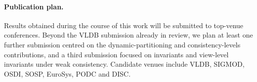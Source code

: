 
\paragraph{Publication plan.}
Results obtained during the course of this work will be submitted to top-venue conferences.
Beyond the VLDB submission already in review, we plan at least one further submission centred on the dynamic-partitioning and consistency-levels contributions, and a third submission focused on invariants and view-level invariants under weak consistency.
Candidate venues include VLDB, SIGMOD, OSDI, SOSP, EuroSys, PODC and DISC.


